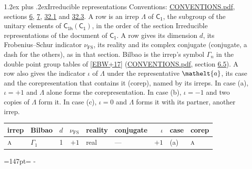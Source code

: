 \documentclass[10pt,a4paper]{article}
\makeatletter
\renewcommand\section{\@startsection{section}{1}{\z@}{-3ex plus -1ex minus -.2ex}%
  {1.2ex plus .2ex}{\normalfont\large\sffamily\bfseries\color{parttitle}}}
\newcommand{\needspace}[1]{\par\penalty-100\begingroup\dimen0=#1\relax\dimen2=\pagegoal
  \advance\dimen2-\pagetotal\ifdim\dimen0>\dimen2\relax\ifdim\dimen2>0pt\vfil\break\fi\fi
  \endgroup}
\numberwithin{equation}{section}
\newcommand{\eltfont}[1]{{\let\sigma\eltsigma\mathelt{#1}}}
\newcommand{\grp}[1]{\mathsf{#1}}
\newcommand{\irr}[1]{\text{\normalfont\scshape #1}}
\newcommand{\elt}[1]{\eltfont{#1}}
\newcommand{\fsind}{\nu_{\mathrm{FS}}}
\makeatother
\begin{document}
\section{Irreducible representations}\label{s:irreps}
Conventions: \href{../../CONVENTIONS.pdf}{CONVENTIONS.pdf}, sections \href{../../../rotation/CONVENTIONS.pdf\#conv.6}{6}, \href{../../../rotation/CONVENTIONS.pdf\#conv.7}{7}, \href{../../CONVENTIONS.pdf\#conv.32.1}{32.1} and \href{../../CONVENTIONS.pdf\#conv.32.3}{32.3}.
\leavevmode\label{n:irrep.Delta}A row is an irrep $\Lambda$ of $\grp{C_{1}}$, the subgroup of the unitary elements of $\grp{C_{1h}}(\grp{C_{1}})$, in the order of the section Irreducible representations of the document of \href{../../../rotation/data/pdf/C1.pdf}{$\grp{C_{1}}$}. \label{n:index.dimension}\label{n:index.frobenius}\label{n:head.irrep}\label{n:head.reality}\label{n:head.conjugate}A row gives its dimension $d$, its Frobenius--Schur indicator $\fsind$, its reality and its complex conjugate (conjugate, a dash for the others), as in that section. \label{n:head.bilbao}\label{n:irrep.alias.gamma}Bilbao is the irrep's symbol $\Gamma_n$ in the double point group tables of [\href{../../../REFERENCES.pdf\#ref.EBW+17}{EBW+17}] (\href{../../CONVENTIONS.pdf}{CONVENTIONS.pdf}, section \href{../../../rotation/CONVENTIONS.pdf\#conv.6.5}{6.5}). \label{n:head.case.corep}\label{n:head.corep}A row also gives the indicator $\iota$ of $\Lambda$ under the representative $\elt{a}$, its case and the corepresentation that contains it (corep), named by its irreps. In case (a), $\iota = +1$ and $\Lambda$ alone forms the corepresentation. In case (b), $\iota = -1$ and two copies of $\Lambda$ form it. In case (c), $\iota = 0$ and $\Lambda$ forms it with its partner, another irrep.
\setlength{\emergencystretch}{2em}\par\setlength{\emergencystretch}{0pt}
{\small\renewcommand{\arraystretch}{1.25}\setlength{\tabcolsep}{4pt}\begin{longtable}{@{}llrrllrll@{}}\toprule
irrep & Bilbao & $d$ & $\fsind$ & reality & conjugate & $\iota$ & case & corep\\\midrule\endhead
\bottomrule\endfoot\endlastfoot
$\irr{a}$ & $\Gamma_{1}$ & 1 & $+1$ & real & --- & $+1$ & (a) & $\irr{a}$\\
\bottomrule\end{longtable}}
\needspace{147pt}
\end{document}
